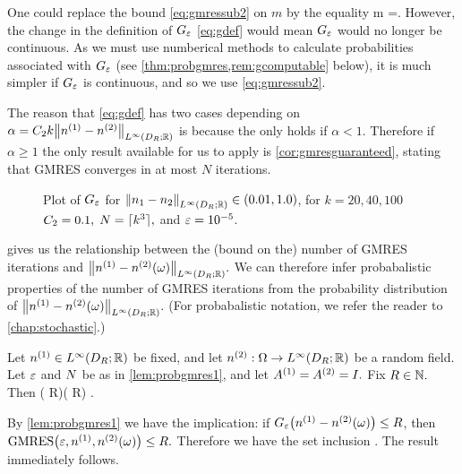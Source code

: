 One could replace the bound \cref{eq:gmressub2} on $m$ by the equality
\beqs
m  =.
\eeqs
However, the change in the definition of $G_{\varepsilon}$ \cref{eq:gdef} would mean $G_{\varepsilon}$ would no longer be continuous. As we must use numberical methods to calculate probabilities associated with $G_{\varepsilon}$ (see \cref{thm:probgmres,rem:gcomputable} below), it is much simpler if $G_{\varepsilon}$ is continuous, and so we use \cref{eq:gmressub2}.
\ere

The reason that \cref{eq:gdef} has two cases depending on $\alpha = \Ct k \NLiDRRR{\nso-\nst}$ is because the  only holds if $\alpha < 1$. Therefore if $\alpha \geq 1$ the only result available for us to apply is \cref{cor:gmresguaranteed}, stating that GMRES converges in at most $N$ iterations.
\ere

\begin{figure}
  \centering
  
  \caption{Plot of $G_{\varepsilon}$ for $\NLiDRRR{\no-\nt} \in \mleft(0.01,1.0\mright)$, for $k=20,40,100$ $C_{2} = 0.1,$ $N=\lceil k^3\rceil,$ and $\varepsilon = 10^{-5}$.\label{fig:G}}
    \end{figure}


 gives us the relationship between the (bound on the) number of GMRES iterations and $\NLiDRRR{\nso-\nst(\omega)}.$ We can therefore infer probabalistic properties of the number of GMRES iterations from the probability distribution of $\NLiDRRR{\nso-\nst(\omega)}.$ (For probabalistic notation, we refer the reader to \cref{chap:stochastic}.)

\label{thm:probgmres}
Let $\nso \in \LiDRRR$ be fixed, and let $\nst:\Omega\rightarrow\LiDRRR$ be a random field. Let $\varepsilon$ and $N$ be as in \cref{lem:probgmres1}, and let ${A}^{(1)} = {A}^{(2)} = I.$ Fix $ R \in \mathbb N.$ Then
\beq\label{eq:GMRESprob}
\PP\mleft(\Gfn{\NLiDRRR{\nso-\nst}} \leq R\mright)\leq\PP\mleft(\GMRES{\eps}{\nso}{\nst} \leq R\mright) .
\eeq
\enth

By \cref{lem:probgmres1} we have the implication: if $\Gfn{\nso-\nst(\omega)} \leq R$, then $\GMRES{\eps}{\nso}{\nst(\omega)} \leq R.$ Therefore we have the set inclusion
\beqs
{} \subseteq {}.
\eeqs
The result immediately follows.
\epf

